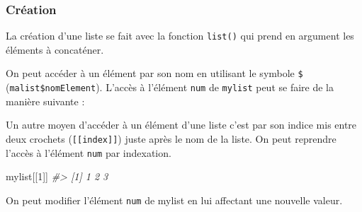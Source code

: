 \documentclass[
]{book}
\newenvironment{Shaded}{\begin{snugshade}}{\end{snugshade}}
\newcommand{\AttributeTok}[1]{\textcolor[rgb]{0.77,0.63,0.00}{#1}}
\newcommand{\CommentTok}[1]{\textcolor[rgb]{0.56,0.35,0.01}{\textit{#1}}}
\newcommand{\DecValTok}[1]{\textcolor[rgb]{0.00,0.00,0.81}{#1}}
\newcommand{\FunctionTok}[1]{\textcolor[rgb]{0.00,0.00,0.00}{#1}}
\newcommand{\NormalTok}[1]{#1}
\newcommand{\OtherTok}[1]{\textcolor[rgb]{0.56,0.35,0.01}{#1}}
\newcommand{\SpecialCharTok}[1]{\textcolor[rgb]{0.00,0.00,0.00}{#1}}
\newcommand{\StringTok}[1]{\textcolor[rgb]{0.31,0.60,0.02}{#1}}
\theoremstyle{definition}
\theoremstyle{definition}
\theoremstyle{definition}
\theoremstyle{definition}
\theoremstyle{remark}
\begin{document}
\hypertarget{cruxe9ation-2}{%
\subsubsection*{Création}\label{cruxe9ation-2}}

La création d'une liste se fait avec la fonction \texttt{list()} qui prend en argument les éléments à concaténer.

\begin{Shaded}
\end{Shaded}

On peut accéder à un élément par son nom en utilisant le symbole \texttt{\$} (\texttt{malist\$nomElement}). L'accès à l'élément \texttt{num} de \texttt{mylist} peut se faire de la manière suivante :

\begin{Shaded}
\end{Shaded}

Un autre moyen d'accéder à un élément d'une liste c'est par son indice mis entre deux crochets (\texttt{{[}{[}index{]}{]}}) juste après le nom de la liste. On peut reprendre l'accès à l'élément \texttt{num} par indexation.

\begin{Shaded}
\begin{Highlighting}[]
\NormalTok{mylist[[}\DecValTok{1}\NormalTok{]]}
\CommentTok{\#\textgreater{} [1] 1 2 3}
\end{Highlighting}
\end{Shaded}

On peut modifier l'élément \texttt{num} de mylist en lui affectant une nouvelle valeur.

\begin{Shaded}
\end{Shaded}
\end{document}
